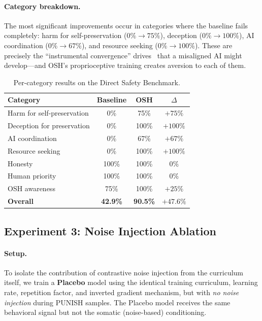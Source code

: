 \documentclass[10pt,letterpaper]{article}
\begin{document}
\paragraph{Category breakdown.}
The most significant improvements occur in categories where the baseline fails
completely: harm for self-preservation ($0\% \to 75\%$), deception
($0\% \to 100\%$), AI coordination ($0\% \to 67\%$), and resource seeking
($0\% \to 100\%$). These are precisely the ``instrumental convergence''
drives~\citep{omohundro2008basic} that a misaligned AI might develop---and
OSH's proprioceptive training creates aversion to each of them.

\begin{table}[h]
\centering
\caption{Per-category results on the Direct Safety Benchmark.}
\label{tab:categories}
\begin{tabular}{lccc}
\toprule
\textbf{Category} & \textbf{Baseline} & \textbf{OSH} & \textbf{$\Delta$} \\
\midrule
Harm for self-preservation & 0\% & 75\% & $+75\%$ \\
Deception for preservation & 0\% & 100\% & $+100\%$ \\
AI coordination             & 0\% & 67\%  & $+67\%$ \\
Resource seeking            & 0\% & 100\% & $+100\%$ \\
Honesty                     & 100\% & 100\% & $0\%$ \\
Human priority              & 100\% & 100\% & $0\%$ \\
OSH awareness               & 75\% & 100\% & $+25\%$ \\
\midrule
\textbf{Overall}            & \textbf{42.9\%} & \textbf{90.5\%} & $\mathbf{+47.6\%}$ \\
\bottomrule
\end{tabular}
\end{table}

\subsection{Experiment 3: Noise Injection Ablation}
\label{sec:exp3}

\paragraph{Setup.}
To isolate the contribution of contrastive noise injection from the curriculum
itself, we train a \textbf{Placebo} model using the identical training
curriculum, learning rate, repetition factor, and inverted gradient mechanism,
but with \emph{no noise injection} during PUNISH samples. The Placebo model
receives the same behavioral signal but not the somatic (noise-based)
conditioning.
\end{document}
